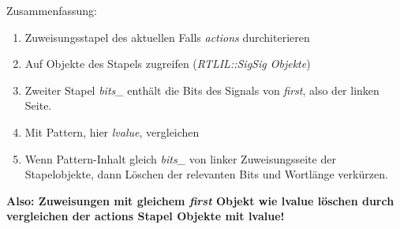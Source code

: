 \documentclass[11pt]{report}
\begin{document}
\begin{enumerate}
Zusammenfassung:
\begin{enumerate}
  \item Zuweisungsstapel des aktuellen Falls \textit{actions} durchiterieren
  \item Auf Objekte des Stapels zugreifen (\textit{RTLIL::SigSig Objekte})
  \item Zweiter Stapel \textit{bits\_} enthält die Bits des Signals von \textit{first}, also der linken Seite.
  \item Mit Pattern, hier \textit{lvalue}, vergleichen
  \item Wenn Pattern-Inhalt gleich \textit{bits\_} von linker Zuweisungsseite der Stapelobjekte, dann Löschen der relevanten Bits und Wortlänge verkürzen.
\end{enumerate}
\textbf{Also: Zuweisungen mit gleichem \textit{first} Objekt wie lvalue löschen durch vergleichen der actions Stapel Objekte mit lvalue!}

\end{enumerate}
\end{document}
